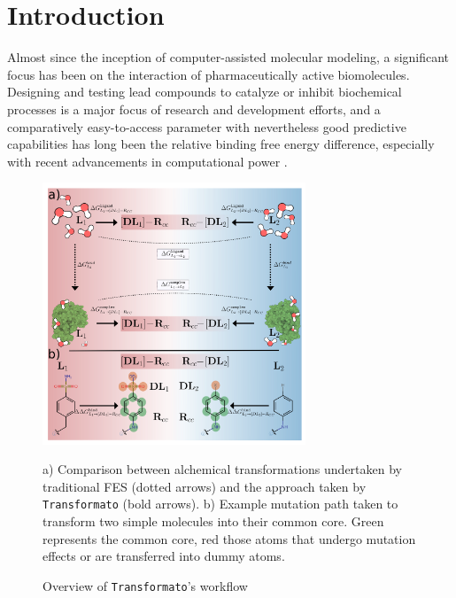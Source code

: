 \documentclass[oneside]{scrreprt}
\begin{document}
\begingroup
\let\clearpage\relax
\renewcommand\contentsname{Table of Contents}
\tableofcontents
{}
\endgroup
\chapter{Introduction}
Almost since the inception of computer-assisted molecular modeling, a significant focus has been on the interaction of pharmaceutically active biomolecules. Designing and testing lead compounds to catalyze or inhibit biochemical processes is a major focus of research and development efforts, and a comparatively easy-to-access parameter with nevertheless good predictive capabilities has long been the relative binding free energy difference, especially with recent advancements in computational power \cite{cournia_relative_2017}.

\begin{figure}[h]
    \begin{center}
        
    
    \includegraphics[width=0.7\textwidth]{FESvsTrafo.png}
    \end{center}
    \caption{Overview of \texttt{Transformato}'s workflow}
    a) Comparison between alchemical transformations undertaken by traditional FES (dotted arrows) and the approach taken by \texttt{Transformato} (bold arrows). b) Example mutation path taken to transform two simple molecules into their common core. Green represents the common core, red those atoms that undergo mutation effects or are transferred into dummy atoms.
    \label{fig:fesvstrafo}
\end{figure}
\end{document}
